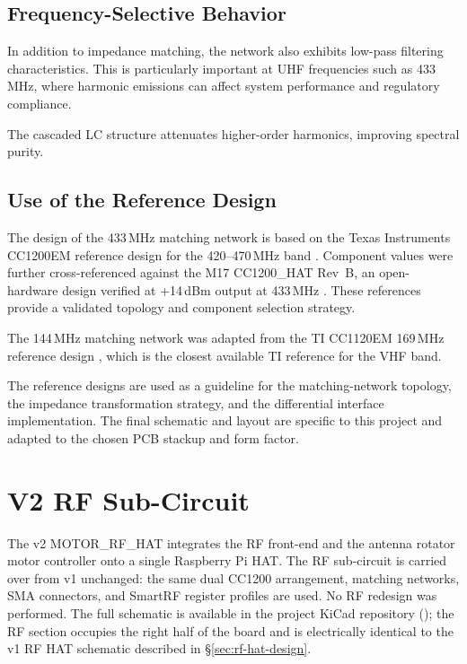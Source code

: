 \subsection{Frequency-Selective Behavior}

In addition to impedance matching, the network also exhibits low-pass filtering characteristics. This is particularly important at UHF frequencies such as 433\,MHz, where harmonic emissions can affect system performance and regulatory compliance.

The cascaded LC structure attenuates higher-order harmonics, improving spectral purity.

\subsection{Use of the Reference Design}

The design of the 433\,MHz matching network is based on the Texas Instruments CC1200EM reference design for the 420--470\,MHz band \cite{swrr122}. Component values were further cross-referenced against the M17 CC1200\_HAT Rev~B, an open-hardware design verified at +14\,dBm output at 433\,MHz \cite{m17cc1200hat}. These references provide a validated topology and component selection strategy.

The 144\,MHz matching network was adapted from the TI CC1120EM 169\,MHz reference design \cite{tidr220}, which is the closest available TI reference for the VHF band.

The reference designs are used as a guideline for the matching-network topology, the impedance transformation strategy, and the differential interface implementation. The final schematic and layout are specific to this project and adapted to the chosen PCB stackup and form factor.

\section{V2 RF Sub-Circuit}
\label{sec:v2-rf}

The v2 MOTOR\_RF\_HAT integrates the RF front-end and the antenna rotator motor controller onto a single Raspberry Pi HAT. The RF sub-circuit is carried over from v1 unchanged: the same dual CC1200 arrangement, matching networks, SMA connectors, and SmartRF register profiles are used. No RF redesign was performed. The full schematic is available in the project KiCad repository (); the RF section occupies the right half of the board and is electrically identical to the v1 RF HAT schematic described in \S\ref{sec:rf-hat-design}.

